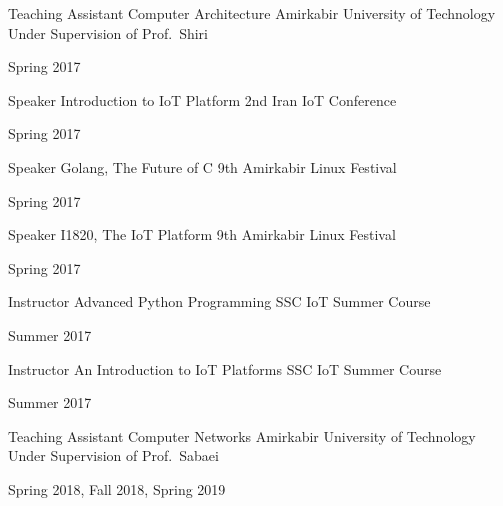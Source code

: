 \begin{cventries}
  \cventry
    {Teaching Assistant} %
    {Computer Architecture} %
    {Amirkabir University of Technology} %
    {Under Supervision of Prof.\ Shiri} %
    {
      \begin{cvitems} %
        Spring 2017
      \end{cvitems}
    }

  \cventry
    {Speaker} %
    {Introduction to IoT Platform} %
    {2nd Iran IoT Conference} %
    {} %
    {
      \begin{cvitems} %
        Spring 2017
      \end{cvitems}
    }

  \cventry
    {Speaker} %
    {Golang, The Future of C} %
    {9th Amirkabir Linux Festival} %
    {} %
    {
      \begin{cvitems} %
        Spring 2017
      \end{cvitems}
    }

  \cventry
    {Speaker} %
    {I1820, The IoT Platform} %
    {9th Amirkabir Linux Festival} %
    {} %
    {
      \begin{cvitems} %
        Spring 2017
      \end{cvitems}
    }

  \cventry
    {Instructor} %
    {Advanced Python Programming} %
    {SSC IoT Summer Course} %
    {} %
    {
      \begin{cvitems} %
        Summer 2017
      \end{cvitems}
    }

  \cventry
    {Instructor} %
    {An Introduction to IoT Platforms} %
    {SSC IoT Summer Course} %
    {} %
    {
      \begin{cvitems} %
        Summer 2017
      \end{cvitems}
    }

  \cventry
    {Teaching Assistant} %
    {Computer Networks} %
    {Amirkabir University of Technology} %
    {Under Supervision of Prof.\ Sabaei} %
    {
      \begin{cvitems} %
        Spring 2018, Fall 2018, Spring 2019
      \end{cvitems}
    }


\end{cventries}
